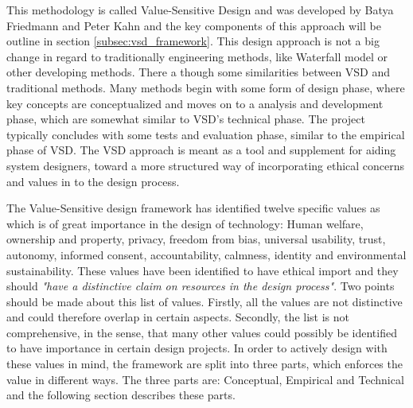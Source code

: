 This methodology is called Value-Sensitive Design and was developed by Batya Friedmann and Peter Kahn and the key components of this approach will be outline in section \ref{subsec:vsd_framework}.\newline
This design approach is not a big change in regard to traditionally engineering methods, like Waterfall model or other developing methods. There a though some similarities between VSD and traditional methods. Many methods begin with some form of design phase, where key concepts are conceptualized and moves on to a analysis and development phase, which are somewhat similar to VSD's technical phase. The project typically concludes with some tests and evaluation phase, similar to the empirical phase of VSD\citep[p. 704]{IntegratingEthicsCummings}.\newline
The VSD approach is meant as a tool and supplement for aiding system designers, toward a more structured way of incorporating ethical concerns and values in to the design process.\newline 

The Value-Sensitive design framework has identified twelve specific values as which is of great importance in the design of technology: Human welfare, ownership and property, privacy, freedom from bias, universal usability, trust, autonomy, informed consent, accountability, calmness, identity and environmental sustainability. These values have been identified to have ethical import and they should \textit{"have a distinctive claim on resources in the design process"}\citep[p. 1187]{HumanValuesEthicsAndDesign}. Two points should be made about this list of values. Firstly, all the values are not distinctive and could therefore overlap in certain aspects. Secondly, the list is not comprehensive, in the sense, that many other values could possibly be identified to have importance in certain design projects.\newline 
In order to actively design with these values in mind, the framework are split into three parts, which enforces the value in different ways. The three parts are: Conceptual, Empirical and Technical and the following section describes these parts. 

